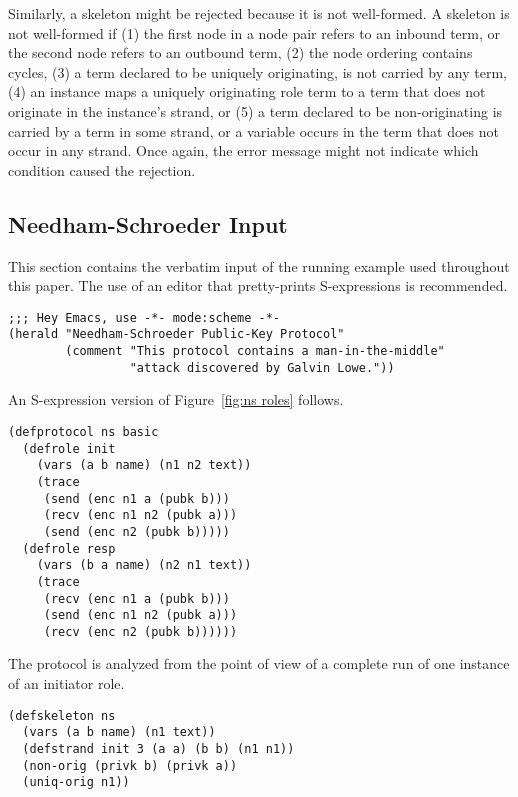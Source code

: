 \documentclass[12pt]{article}
\begin{document}
Similarly, a skeleton might be rejected because it is not
well-formed.  A skeleton is not
well-formed if (1) the first node in a node pair refers to an inbound
term, or the second node refers to an outbound term, (2) the node
ordering contains cycles, (3) a term declared to be uniquely
originating, is not carried by any term, (4) an instance maps a
uniquely originating role term to a term that does not originate in
the instance's strand, or (5) a term declared to be non-originating is
carried by a term in some strand, or a variable occurs in the term
that does not occur in any strand.  Once again, the error message might
not indicate which condition caused the rejection.

\subsection{Needham-Schroeder Input}

\begin{sloppypar}
This section contains the verbatim input of the running example used
throughout this paper.  The use of an editor that pretty-prints
S-expressions is recommended.
\end{sloppypar}

\begin{verbatim}
;;; Hey Emacs, use -*- mode:scheme -*-
(herald "Needham-Schroeder Public-Key Protocol"
        (comment "This protocol contains a man-in-the-middle"
                 "attack discovered by Galvin Lowe."))
\end{verbatim}

An S-expression version of Figure~\ref{fig:ns roles} follows.

\begin{verbatim}
(defprotocol ns basic
  (defrole init
    (vars (a b name) (n1 n2 text))
    (trace
     (send (enc n1 a (pubk b)))
     (recv (enc n1 n2 (pubk a)))
     (send (enc n2 (pubk b)))))
  (defrole resp
    (vars (b a name) (n2 n1 text))
    (trace
     (recv (enc n1 a (pubk b)))
     (send (enc n1 n2 (pubk a)))
     (recv (enc n2 (pubk b))))))
\end{verbatim}

The protocol is analyzed from the point of view of a complete run of
one instance of an initiator role.

\begin{verbatim}
(defskeleton ns
  (vars (a b name) (n1 text))
  (defstrand init 3 (a a) (b b) (n1 n1))
  (non-orig (privk b) (privk a))
  (uniq-orig n1))
\end{verbatim}
\end{document}
